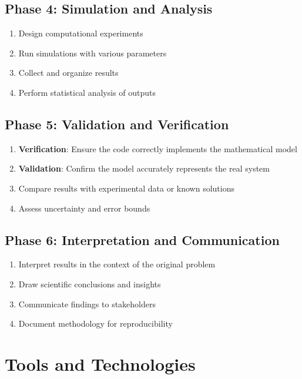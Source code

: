 \subsection{Phase 4: Simulation and Analysis}
\begin{enumerate}
  \item Design computational experiments
  \item Run simulations with various parameters
  \item Collect and organize results
  \item Perform statistical analysis of outputs
\end{enumerate}

\subsection{Phase 5: Validation and Verification}
\begin{enumerate}
  \item \textbf{Verification}: Ensure the code correctly implements the mathematical model
  \item \textbf{Validation}: Confirm the model accurately represents the real system
  \item Compare results with experimental data or known solutions
  \item Assess uncertainty and error bounds
\end{enumerate}

\subsection{Phase 6: Interpretation and Communication}
\begin{enumerate}
  \item Interpret results in the context of the original problem
  \item Draw scientific conclusions and insights
  \item Communicate findings to stakeholders
  \item Document methodology for reproducibility
\end{enumerate}

\section{Tools and Technologies}

